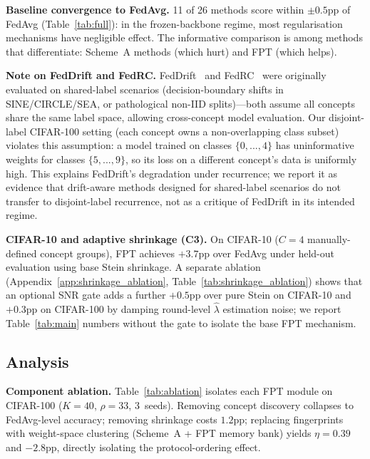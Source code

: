 \documentclass[11pt]{article}
\begin{document}
\textbf{Baseline convergence to FedAvg.}
11 of 26 methods score within $\pm 0.5$pp of FedAvg (Table~\ref{tab:full}): in the frozen-backbone regime, most regularisation mechanisms have negligible effect.
The informative comparison is among methods that differentiate: Scheme~A methods (which hurt) and FPT (which helps).

\textbf{Note on FedDrift and FedRC.}
FedDrift~\citep{jothimurugesan2023federated} and FedRC~\citep{guo2024fedrc} were originally evaluated on shared-label scenarios (decision-boundary shifts in SINE/CIRCLE/SEA, or pathological non-IID splits)---both assume all concepts share the same label space, allowing cross-concept model evaluation.
Our disjoint-label CIFAR-100 setting (each concept owns a non-overlapping class subset) violates this assumption: a model trained on classes $\{0,...,4\}$ has uninformative weights for classes $\{5,...,9\}$, so its loss on a different concept's data is uniformly high.
This explains FedDrift's degradation under recurrence; we report it as evidence that drift-aware methods designed for shared-label scenarios do not transfer to disjoint-label recurrence, not as a critique of FedDrift in its intended regime.

\textbf{CIFAR-10 and adaptive shrinkage (C3).}
On CIFAR-10 ($C{=}4$ manually-defined concept groups), FPT achieves $+3.7$pp over FedAvg under held-out evaluation using base Stein shrinkage.
A separate ablation (Appendix~\ref{app:shrinkage_ablation}, Table~\ref{tab:shrinkage_ablation}) shows that an optional SNR gate adds a further $+0.5$pp over pure Stein on CIFAR-10 and $+0.3$pp on CIFAR-100 by damping round-level $\hat\lambda$ estimation noise; we report Table~\ref{tab:main} numbers without the gate to isolate the base FPT mechanism.


\subsection{Analysis}

\textbf{Component ablation.}
Table~\ref{tab:ablation} isolates each FPT module on CIFAR-100 ($K{=}40$, $\rho{=}33$, 3~seeds).
Removing concept discovery collapses to FedAvg-level accuracy; removing shrinkage costs $1.2$pp; replacing fingerprints with weight-space clustering (Scheme~A + FPT memory bank) yields $\eta = 0.39$ and $-2.8$pp, directly isolating the protocol-ordering effect.
\end{document}
